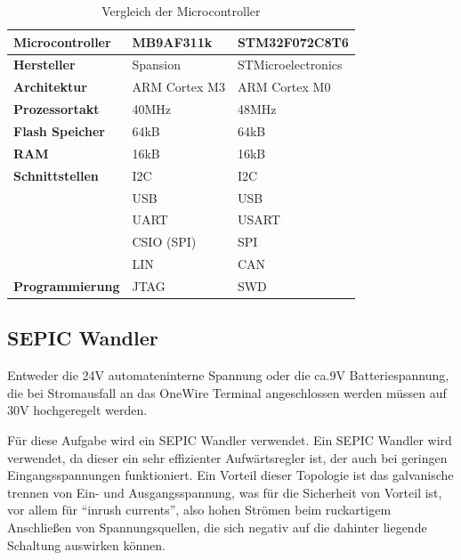 \begin{table}[H]
    \centering
    \begin{tabular}{|l|l|l|}
        \hline
        \textbf{Microcontroller} & \textbf{MB9AF311k}     & \textbf{STM32F072C8T6} \\
        \hline
        \textbf{Hersteller}      & Spansion               & STMicroelectronics     \\
        \hline
        \textbf{Architektur}     & ARM Cortex M3          & ARM Cortex M0          \\
        \hline
        \textbf{Prozessortakt}   & 40MHz                  & 48MHz                  \\
        \hline
        \textbf{Flash Speicher}  & 64kB                   & 64kB                   \\
        \hline
        \textbf{\acs{RAM}}       & 16kB                   & 16kB                   \\
        \hline
        \textbf{Schnittstellen}  &
        \acs{I2C}                & \acs{I2C}                                       \\
                                 & \acs{USB}              & \acs{USB}              \\
                                 & \acs{UART}             & \acs{USART}            \\
                                 & \acs{CSIO} (\acs{SPI}) & \acs{SPI}              \\
                                 & \acs{LIN}              & \acs{CAN}              \\
        \hline
        \textbf{Programmierung}  & \acs{JTAG}             & \acs{SWD}              \\
        \hline
    \end{tabular}
    \caption{Vergleich der Microcontroller}
    \label{tab:mcuVergleich}
\end{table}

\subsection{\ac{SEPIC} Wandler}
Entweder die 24V automateninterne Spannung oder die ca.9V Batteriespannung, die bei Stromausfall an das
OneWire Terminal angeschlossen werden müssen auf 30V hochgeregelt werden.

Für diese Aufgabe wird ein \ac{SEPIC} Wandler verwendet. Ein \ac{SEPIC} Wandler wird verwendet, da dieser
ein sehr effizienter Aufwärtsregler ist, der auch bei geringen Eingangsspannungen funktioniert. Ein Vorteil
dieser Topologie ist das galvanische trennen von Ein- und Ausgangsspannung, was für die Sicherheit von Vorteil ist,
vor allem für \enquote{inrush currents}, also hohen Strömen beim ruckartigem Anschließen von Spannungsquellen,
die sich negativ auf die dahinter liegende Schaltung auswirken können.

